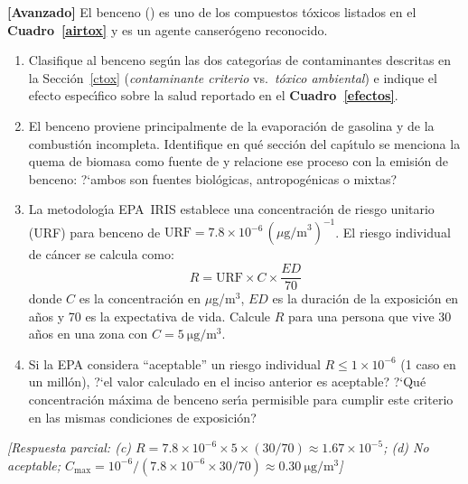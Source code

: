 \begin{bloque_ejercicios}
\begin{ejercicios}
\item \textbf{[Avanzado]} El benceno () es uno de los compuestos
t\'oxicos listados en el \textbf{Cuadro~\ref{airtox}} y es un agente
canser\'ogeno reconocido.

\begin{enumerate}[label=\alph*)]
    \item Clasifique al benceno seg\'un las dos categor\'{\i}as de
          contaminantes descritas en la Secci\'on~\ref{ctox}
          (\textit{contaminante criterio} vs.\ \textit{t\'oxico ambiental})
          e indique el efecto espec\'{\i}fico sobre la salud reportado en
          el \textbf{Cuadro~\ref{efectos}}.

    \item El benceno proviene principalmente de la evaporaci\'on
          de gasolina y de la combusti\'on incompleta. Identifique
          en qu\'e secci\'on del cap\'{\i}tulo se menciona la quema de
          biomasa como fuente de  y relacione ese proceso
          con la emisi\'on de benceno: ?`ambos son fuentes
          biol\'ogicas, antropog\'enicas o mixtas?

    \item La metodolog\'{\i}a EPA~IRIS establece una concentraci\'on
          de riesgo unitario (URF) para benceno de
          $\text{URF} = 7.8\times10^{-6}\,(\mu\text{g/m}^3)^{-1}$.
          El riesgo individual de c\'ancer se calcula como:
          \[
              R = \text{URF} \times C \times \frac{ED}{70}
          \]
          donde $C$ es la concentraci\'on en $\mu$g/m$^3$,
          $ED$ es la duraci\'on de la exposici\'on en a\~nos y 70 es
          la expectativa de vida. Calcule $R$ para una persona que
          vive 30 a\~nos en una zona con $C = \SI{5}{\micro\gram\per\cubic\metre}$.

    \item Si la EPA considera ``aceptable'' un riesgo individual
          $R \leq 1\times10^{-6}$ (1 caso en un mill\'on),
          ?`el valor calculado en el inciso anterior es aceptable?
          ?`Qu\'e concentraci\'on m\'axima de benceno ser\'{\i}a permisible
          para cumplir este criterio en las mismas condiciones
          de exposici\'on?
\end{enumerate}

\textit{[Respuesta parcial:
(c) $R = 7.8\times10^{-6} \times 5 \times (30/70)
    \approx 1.67\times10^{-5}$;
(d) No aceptable; $C_{\max} = 10^{-6}/(7.8\times10^{-6}\times 30/70)
    \approx \SI{0.30}{\micro\gram\per\cubic\metre}$]}

\end{ejercicios}

\end{bloque_ejercicios}
